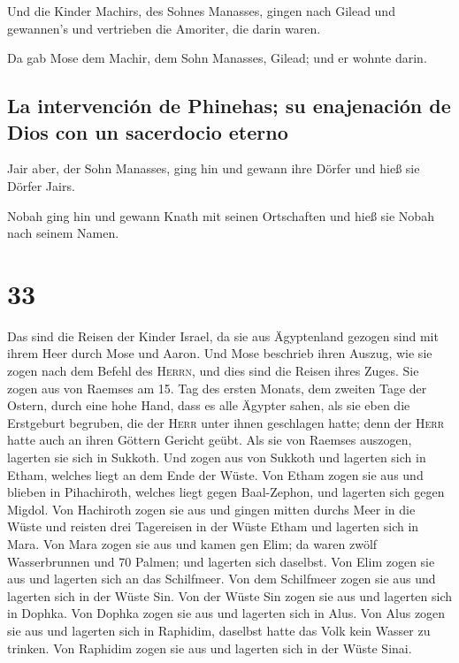  Und die Kinder Machirs, des Sohnes Manasses, gingen nach
Gilead und gewannen's und vertrieben die Amoriter, die darin waren.

 Da gab Mose dem Machir, dem Sohn Manasses, Gilead; und
er wohnte darin.

\hypertarget{la-intervenciuxf3n-de-phinehas-su-enajenaciuxf3n-de-dios-con-un-sacerdocio-eterno}{%
\subsection{La intervención de Phinehas; su enajenación de Dios con un
sacerdocio
eterno}\label{la-intervenciuxf3n-de-phinehas-su-enajenaciuxf3n-de-dios-con-un-sacerdocio-eterno}}

 Jair aber, der Sohn Manasses, ging hin und gewann ihre
Dörfer und hieß sie Dörfer Jairs.

 Nobah ging hin und gewann Knath mit seinen Ortschaften
und hieß sie Nobah nach seinem Namen.

\hypertarget{section-32}{%
\section{33}\label{section-32}}

 Das sind die Reisen der Kinder Israel, da sie aus
Ägyptenland gezogen sind mit ihrem Heer durch Mose und Aaron.
 Und Mose beschrieb ihren Auszug, wie sie zogen nach dem
Befehl des \textsc{Herrn}, und dies sind die Reisen ihres Zuges.
 Sie zogen aus von Raemses am 15. Tag des ersten Monats,
dem zweiten Tage der Ostern, durch eine hohe Hand, dass es alle Ägypter
sahen,  als sie eben die Erstgeburt begruben, die der
\textsc{Herr} unter ihnen geschlagen hatte; denn der \textsc{Herr} hatte
auch an ihren Göttern Gericht geübt.  Als sie von Raemses
auszogen, lagerten sie sich in Sukkoth.  Und zogen aus von
Sukkoth und lagerten sich in Etham, welches liegt an dem Ende der Wüste.
 Von Etham zogen sie aus und blieben in Pihachiroth,
welches liegt gegen Baal-Zephon, und lagerten sich gegen Migdol.
 Von Hachiroth zogen sie aus und gingen mitten durchs Meer
in die Wüste und reisten drei Tagereisen in der Wüste Etham und lagerten
sich in Mara.  Von Mara zogen sie aus und kamen gen Elim;
da waren zwölf Wasserbrunnen und 70 Palmen; und lagerten sich daselbst.
 Von Elim zogen sie aus und lagerten sich an das
Schilfmeer.  Von dem Schilfmeer zogen sie aus und
lagerten sich in der Wüste Sin.  Von der Wüste Sin zogen
sie aus und lagerten sich in Dophka.  Von Dophka zogen
sie aus und lagerten sich in Alus.  Von Alus zogen sie
aus und lagerten sich in Raphidim, daselbst hatte das Volk kein Wasser
zu trinken.  Von Raphidim zogen sie aus und lagerten sich
in der Wüste Sinai.

